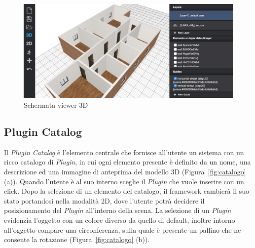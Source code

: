 \begin{figure}[htbp] %
   \centering
   \includegraphics[width=1\linewidth]{images/3d}
   \caption{Schermata viewer 3D }
   \label{fig:viewer3D}
\end{figure}
\newpage

\subsection{Plugin Catalog}
\label{sec:chapter_2_section_2_sub_3}

\noindent
 Il \emph{Plugin Catalog} \`e l'elemento centrale che fornisce all'utente un sistema con un ricco catalogo di \emph{Plugin},
 in cui ogni elemento presente \`e definito da un nome, una descrizione ed una
 immagine di anteprima del modello 3D (Figura~\ref{fig:catalogo} (a)). Quando l'utente \`e al suo interno
 sceglie il \emph{Plugin} che vuole inserire con un click.
 Dopo la selezione di un elemento del catalogo, il framework cambierà il suo stato portandosi nella modalit\`a 2D,
 dove l'utente potrà decidere il posizionamento del \emph{Plugin} all'interno della scena.
 La selezione di un \emph{Plugin} evidenzia l'oggetto con un colore diverso da quello di default, inoltre intorno all'oggetto
 compare una circonferenza, sulla quale è presente un pallino che ne consente la rotazione (Figura~\ref{fig:catalogo} (b)).

